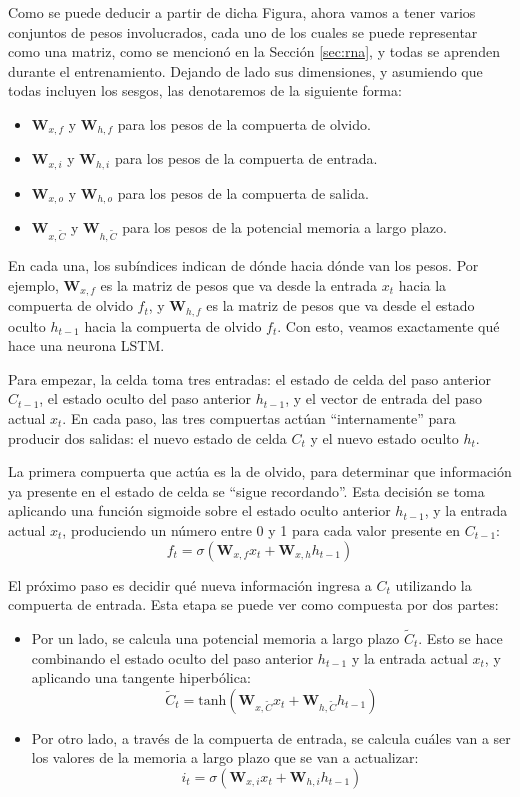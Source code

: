 \documentclass[../../main.tex]{subfiles}
\begin{document}
Como se puede deducir a partir de dicha Figura, ahora vamos a tener varios conjuntos de
pesos involucrados, cada uno de los cuales se puede representar como una matriz, como se
mencionó en la Sección \ref{sec:rna}, y todas se aprenden durante el entrenamiento.
Dejando de lado sus dimensiones, y asumiendo que todas incluyen los sesgos, las
denotaremos de la siguiente forma:
\begin{itemize}
    \item \(\bm{W}_{x,f}\) y \(\bm{W}_{h,f}\) para los pesos de la compuerta de olvido.
    \item \(\bm{W}_{x,i}\) y \(\bm{W}_{h,i}\) para los pesos de la compuerta de entrada.
    \item \(\bm{W}_{x,o}\) y \(\bm{W}_{h,o}\) para los pesos de la compuerta de salida.
    \item \(\bm{W}_{x, \tilde{C}}\) y \(\bm{W}_{h, \tilde{C}}\) para los pesos de la potencial
    memoria a largo plazo.
\end{itemize}
En cada una, los subíndices indican de dónde hacia dónde van los pesos. Por ejemplo,
\(\bm{W}_{x,f}\) es la matriz de pesos que va desde la entrada \(x_t\) hacia la compuerta
de olvido \(f_t\), y \(\bm{W}_{h,f}\) es la matriz de pesos que va desde el estado oculto
\(h_{t-1}\) hacia la compuerta de olvido \(f_t\). Con esto, veamos exactamente qué
hace una neurona LSTM.

Para empezar, la celda toma tres entradas: el estado de celda del paso anterior
\(C_{t-1}\), el estado oculto del paso anterior \(h_{t-1}\), y el vector de entrada del
paso actual \(x_t\). En cada paso, las tres compuertas actúan ``internamente'' para
producir dos salidas: el nuevo estado de celda \(C_t\) y el nuevo estado oculto \(h_t\).

La primera compuerta que actúa es la de olvido, para determinar que información ya
presente en el estado de celda se ``sigue recordando''. Esta decisión se toma aplicando
una función sigmoide sobre el estado oculto anterior \(h_{t-1}\), y la entrada actual
\(x_t\), produciendo un número entre 0 y 1 para cada valor presente en \(C_{t-1}\):
\[
    f_t = \sigma \left( \bm{W}_{x,f} x_t + \bm{W}_{x,h} h_{t-1}  \right)
\]

El próximo paso es decidir qué nueva información ingresa a \(C_t\) utilizando la compuerta
de entrada. Esta etapa se puede ver como compuesta por dos partes:
\begin{itemize}
    \item Por un lado, se calcula una potencial memoria a largo plazo \(\tilde{C}_t\).
    Esto se hace combinando el estado oculto del paso anterior \(h_{t-1}\) y la entrada
    actual \(x_t\), y aplicando una tangente hiperbólica:
    \[
        \tilde{C}_t = \text{tanh} \left( \bm{W}_{x, \tilde{C}} x_t + \bm{W}_{h, \tilde{C}} h_{t-1}  \right)
    \]
    \item Por otro lado, a través de la compuerta de entrada, se calcula cuáles
    van a ser los valores de la memoria a largo plazo que se van a actualizar:
    \[
        i_t = \sigma \left( \bm{W}_{x, i} x_t + \bm{W}_{h, i} h_{t-1}  \right)
    \]
\end{itemize}
\end{document}
